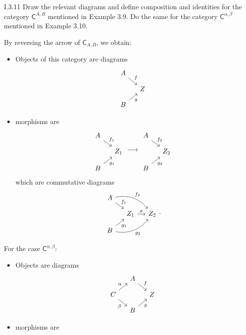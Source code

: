 \begin{problem}{I.3.11}
Draw the relevant diagrams and define composition and identities for the category $\mathsf{C}^{A,B}$ mentioned in Example 3.9. Do the same for the category $\mathsf{C}^{\alpha, \beta}$ mentioned in Example 3.10. 
\end{problem}
\begin{solution}
By reversing the arrow of $\mathsf{C}_{A,B}$, we obtain:
\begin{itemize}
\setlength\itemsep{0pt}
\item Objects of this category are diagrams
\[
\begin{tikzcd}[column sep=small, row sep=small]
A \arrow[dr, "f"] \\
& Z \\
B \arrow[ur, "g"']
\end{tikzcd}
\]
\item morphisms are 
\[
\begin{tikzcd}[column sep=small, row sep=small]
A \arrow[dr, "f_1"] \\
& Z_1 \\
B \arrow[ur, "g_1"']
\end{tikzcd}
\longrightarrow
\begin{tikzcd}[column sep=small, row sep=small]
A \arrow[dr, "f_2"] \\
& Z_2 \\
B \arrow[ur, "g_2"']
\end{tikzcd}    
\]
which are commutative diagrams
\[
\begin{tikzcd}[column sep=small, row sep=small]
A \arrow[dr, "f_1"] \arrow[drr, bend left, "f_2"] \\
&Z_1 \arrow[r, "\sigma"] &Z_2 \\
B \arrow[ur, "g_1"'] \arrow[urr, bend right, "g_2"']
\end{tikzcd}.
\]
\end{itemize}
For the case $\mathsf{C}^{\alpha, \beta}$:
\begin{itemize}
\item Objects are diagrams
\[
\begin{tikzcd}[column sep=small, row sep=small]
&A \arrow[dr, "f"] \\
C\arrow[ur, "\alpha"]\arrow[dr, "\beta"'] & &Z \\
&B \arrow[ur, "g"']
\end{tikzcd}  
\]
\item morphisms are 
\[
\begin{tikzcd}[column sep=small, row sep=small]

\end{tikzcd}\]
\end{itemize}
\end{solution}
